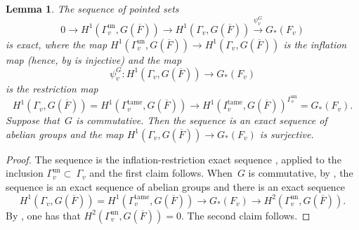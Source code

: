 \documentclass[a4paper,english,12pt]{amsart}
\newcommand{\oF}{\overline F}
\newcommand{\Fv}{F_v}
\newcommand{\Gfs}{G(\overline{F})}
\newcommand{\muu}{\boldsymbol{\mu}}
\DeclareMathOperator{\Hom}{Hom}
\DeclareMathOperator{\cont}{cont}
\DeclareMathOperator{\Frob}{Frob}
\DeclareMathOperator{\un}{un}
\DeclareMathOperator{\tame}{{tame}}
\newtheorem{lem}[equation]{Lemma}
\numberwithin{equation}{subsection}
\begin{document}
\begin{lem} \label{funddefh} %
The sequence of pointed sets $$0\to H^1(\Gamma_v^{\un}, \Gfs)\to H^1(\Gamma_v, \Gfs)\xrightarrow{\psi^G_v} G_*(F_v)$$ is exact, where the map $H^1(\Gamma_v^{\un}, \Gfs)\to H^1(\Gamma_v, \Gfs)$ is the inflation map (hence, by  \cite[Chapter I, Section 5.8 (a)]{Cohomologiegalois} is injective) and the map $$\psi^G_v:H^1(\Gamma_v, \Gfs)\to G_*(F_v)$$ is the restriction map $$H^1(\Gamma_v, \Gfs)=H^1(\Gamma_v^{\tame}, \Gfs)\to H^1(I_v^{\tame}, \Gfs)^{\Gamma_v^{\un}}=G_*(\Fv).$$ %
Suppose that~$G$ is commutative. Then the sequence is an exact sequence of abelian groups and the map $H^1(\Gamma_v, G(\overline F))\to G_*(F_v)$ is surjective.
\end{lem}
\begin{proof}
The sequence is the inflation-restriction exact sequence \cite[Chapter I, \S 5.8 (a)]{Cohomologiegalois}, applied to the inclusion $\Gamma_v^{\un}\subset~\Gamma_v$ and the first claim follows. When~$G$ is commutative, 
by \cite[Chapter I, \S 2.6 (b)]{Cohomologiegalois}, the sequence is an exact sequence of abelian groups and there is an exact sequence $$H^1(\Gamma_v, G(\overline F))=H^1(\Gamma_v^{\tame}, G(\overline F))\to G_*(F_v)\to H^2(\Gamma_v^{\un}, G(\overline F)).$$ By \cite[Page 387]{CohomologyNF}, one has that $H^2(\Gamma_v^{\un}, G(\overline F))=0.$ The second claim follows. 
\end{proof}
\end{document}
